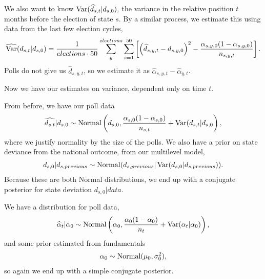 \documentclass[thesis.tex]{subfiles}
\begin{document}
We also want to know \(\operatorname{Var}(\widehat{d}_{s, t} | d_{s, 0}),\) the variance in the relative position \(t\) months before the election of state \(s\). By a similar process, we estimate this using data from the last few election cycles, \begin{equation*}\begin{aligned}
	\widehat{\operatorname{Var}}(d_{s, t} | d_{s, 0}) = \frac{1}{elections \cdot 50} \sum_{y}^{elections} \sum_{s=1}^{50} \left[ \left( \widehat{d}_{s, y, t} - d_{s, y, 0}\right)^2 - \frac{\alpha_{s, y, 0} (1 - \alpha_{s, y, 0})}{n_{s, y, t}} \right].
\end{aligned}\end{equation*} Polls do not give us \(\widehat{d}_{s, y, t}\), so we  estimate it as \(\widehat{\alpha}_{s, y, t} - \widehat{\alpha}_{y, t}\). 

Now we have our estimates on variance, dependent only on time \(t\).

From before, we have our poll data \begin{equation*}\begin{aligned}
\widehat{d_{s, t}} | d_{s, 0} \sim \operatorname{Normal}\left(d_{s, 0}, \frac{\alpha_{s, 0} (1 - \alpha_{s, 0})}{n_{s, t}} + \operatorname{Var}(d_{s, t} | d_{s, 0}\right),
\end{aligned}\end{equation*} where we justify normality by the size of the polls. We also have a prior on state deviance from the national outcome, from our multilevel model, \begin{equation*}\begin{aligned}
d_{s, 0} | d_{s, previous} \sim \operatorname{Normal}(d_{s, previous} | \operatorname{Var}(d_{s, 0} | d_{s, previous})).
\end{aligned}\end{equation*} Because these are both Normal distributions, we end up with a conjugate posterior for state deviation \(d_{s, 0} | data\).

We have a distribution for poll data, \begin{equation*}\begin{aligned}
\widehat{\alpha}_t | \alpha_0 \sim \operatorname{Normal}\left( \alpha_0, \frac{\alpha_0 (1 - \alpha_0)}{n_t} + \operatorname{Var}(\alpha_t | \alpha_0) \right),
\end{aligned}\end{equation*} and some prior estimated from fundamentals \begin{equation*}\begin{aligned}
	\alpha_0 \sim \operatorname{Normal}(\mu_0, \sigma_0^2),
\end{aligned}\end{equation*} so again we end up with a simple conjugate posterior.
\end{document}
